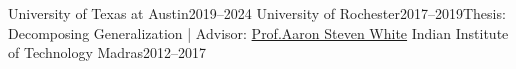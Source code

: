     {University of Texas at Austin}{2019--2024}{}{}
    {University of Rochester}{2017--2019}{Thesis: Decomposing Generalization | Advisor: \href{http://aaronstevenwhite.io}{Prof.Aaron Steven White}}{}
    {Indian Institute of Technology Madras}{2012--2017}{}{}

